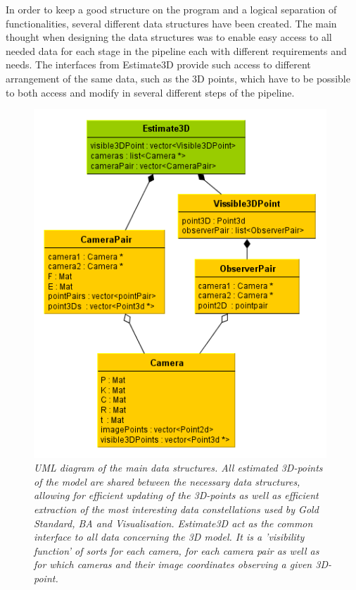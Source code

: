 In order to keep a good structure on the program and a logical separation of functionalities, several different data structures have been created. The main thought when designing the data structures was to enable easy access to all needed data for each stage in the pipeline each with different requirements and needs. The interfaces from Estimate3D provide such access to different arrangement of the same data, such as the 3D points, which have to be possible to both access and modify in several different steps of the pipeline.

\begin{figure}[htb]
	\centering
	\includegraphics[width=110mm]{images/data_structures_uml.png}
	\caption{\textit{UML diagram of the main data structures. All estimated 3D-points of the model are shared between the necessary data structures, allowing for efficient updating of the 3D-points as well as efficient extraction of the most interesting data constellations used by Gold Standard, BA and Visualisation. Estimate3D act as the common interface to all data concerning the 3D model. It is a 'visibility function' of sorts for each camera, for each camera pair as well as for which cameras and their image coordinates observing a given 3D-point.}}
	\label{fig:UML_fig} %
\end{figure}

